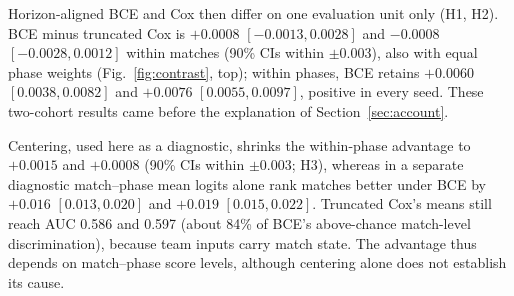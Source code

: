 \documentclass[sigconf,anonymous,nonacm]{acmart}
\begin{document}
Horizon-aligned BCE and Cox then differ on one evaluation unit only (H1, H2). BCE minus truncated Cox is $+0.0008$ $[-0.0013,\allowbreak 0.0028]$ and $-0.0008$ $[-0.0028,\allowbreak 0.0012]$ within matches (90\% CIs within $\pm0.003$), also with equal phase weights (Fig.~\ref{fig:contrast}, top); within phases, BCE retains $+0.0060$ $[0.0038,\allowbreak 0.0082]$ and $+0.0076$ $[0.0055,\allowbreak 0.0097]$, positive in every seed. These two-cohort results came before the explanation of Section~\ref{sec:account}.

Centering, used here as a diagnostic, shrinks the within-phase advantage to $+0.0015$ and $+0.0008$ (90\% CIs within $\pm0.003$; H3), whereas in a separate diagnostic match--phase mean logits alone rank matches better under BCE by $+0.016$ $[0.013,\allowbreak 0.020]$ and $+0.019$ $[0.015,\allowbreak 0.022]$. Truncated Cox's means still reach AUC 0.586 and 0.597 (about 84\% of BCE's above-chance match-level discrimination), because team inputs carry match state. The advantage thus depends on match--phase score levels, although centering alone does not establish its cause.
\end{document}
